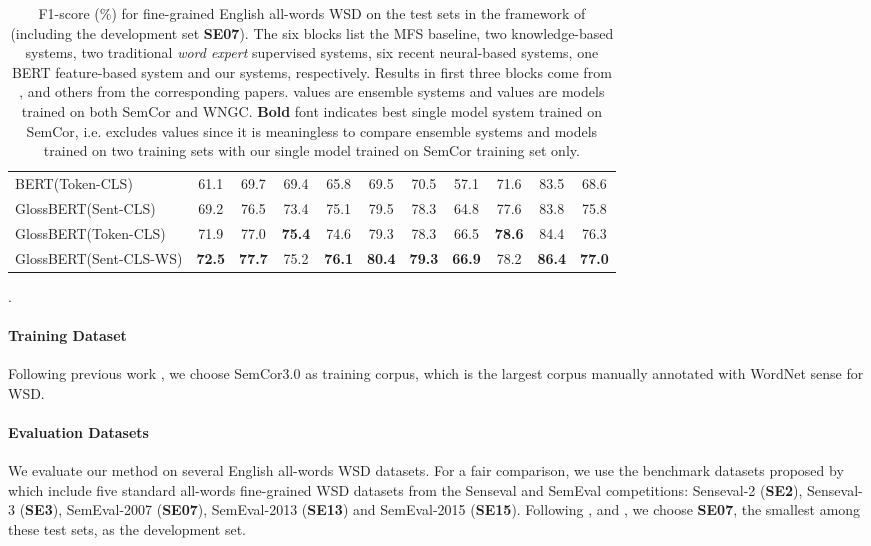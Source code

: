 \documentclass[11pt,a4paper]{article}
\begin{document}
\begin{table*} [t]
{\begin{tabular}{|l|c|c c c c|c c c c|c|}
    \hline
    BERT(Token-CLS) & 61.1 & 69.7 & 69.4 & 65.8 & 69.5 & 70.5 & 57.1 & 71.6 & 83.5 & 68.6 \\
    GlossBERT(Sent-CLS) & 69.2 & 76.5 & 73.4 & 75.1 & 79.5 & 78.3 & 64.8 & 77.6 & 83.8 & 75.8 \\
    GlossBERT(Token-CLS) & 71.9 & 77.0 & \bf 75.4 & 74.6 & 79.3 & 78.3 & 66.5 & \bf 78.6 & 84.4 & 76.3 \\
    GlossBERT(Sent-CLS-WS) & \bf 72.5 & \bf 77.7 & 75.2 & \bf 76.1 & \bf 80.4 & \bf 79.3 & \bf 66.9 & 78.2 & \bf 86.4 & \bf 77.0 \\
    \hline
    \end{tabular}
    }
    \caption{F1-score (\%) for fine-grained English all-words WSD on the test sets in the framework of \citet{raganato2017word} (including the development set \textbf{SE07}). The six blocks list the MFS baseline, two knowledge-based systems, two traditional \textit{word expert} supervised systems, six recent neural-based systems, one BERT feature-based system and our systems, respectively. Results in first three blocks come from \citet{raganato2017word}, and others from the corresponding papers.  values are ensemble systems and  values are models trained on both SemCor and WNGC. \textbf{Bold} font indicates best single model system trained on SemCor, i.e. excludes   values since it is meaningless to compare ensemble systems and models trained on two training sets with our single model trained on SemCor training set only.
    } \label{main results}.
    \vspace{-0.2in}
\end{table*}






\paragraph{Training Dataset}
Following previous work \citep{luo2018leveraging,luo2018incorporating,raganato2017neural,raganato2017word,iacobacci2016embeddings,zhong2010makes}, we choose SemCor3.0 as training corpus, which is the largest corpus manually annotated with WordNet sense for WSD.

\paragraph{Evaluation Datasets}
We evaluate our method on several English all-words WSD datasets. For a fair comparison, we use the benchmark datasets proposed by \citet{raganato2017word} which include five standard all-words fine-grained WSD datasets from the Senseval and SemEval competitions: Senseval-2 (\textbf{SE2}), Senseval-3 (\textbf{SE3}), SemEval-2007 (\textbf{SE07}), SemEval-2013 (\textbf{SE13}) and SemEval-2015 (\textbf{SE15}). Following \citet{luo2018leveraging}, \citet{luo2018incorporating} and \citet{raganato2017neural}, we choose \textbf{SE07}, the smallest among these test sets, as the development set.
\end{document}
